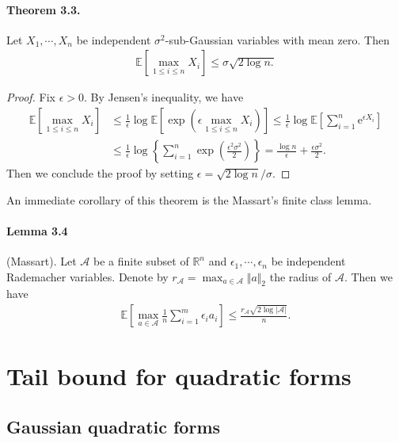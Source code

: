 \documentclass{article}
\newcommand{\E}{\mathbb{E}}
\begin{document}
\paragraph{Theorem 3.3.} Let $X_1,\cdots,X_n$ be independent $\sigma^2$-sub-Gaussian variables with mean zero. Then
\begin{align*}
	\E\left[\max_{1\leq i\leq n}X_i\right] \leq \sigma\sqrt{2\log n.}\tag{3.4}
\end{align*}
\begin{proof}
Fix $\epsilon > 0.$ By Jensen's inequality, we have
\begin{align*}
	\E\left[\max_{1\leq i\leq n}X_i\right] &\leq \frac{1}{\epsilon}\log \E\left[\exp\left(\epsilon\max_{1\leq i\leq n}X_i\right)\right] \leq \frac{1}{\epsilon}\log\E\left[\sum_{i=1}^n \mathrm{e}^{\epsilon X_i}\right]\\
	&\leq \frac{1}{\epsilon}\log\left\{\sum_{i=1}^n \exp\left(\frac{\epsilon^2\sigma^2}{2}\right)\right\}
	= \frac{\log n}{\epsilon}+\frac{\epsilon\sigma^2}{2}.\tag{3.5}
\end{align*}
Then we conclude the proof by setting $\epsilon = \sqrt{2\log n}/\sigma$.
\end{proof}

An immediate corollary of this theorem is the Massart's finite class lemma.
\paragraph{Lemma 3.4} (Massart). Let $\mathcal{A}$ be a finite subset of $\mathbb{R}^n$ and $\epsilon_1,\cdots,\epsilon_n$ be independent Rademacher variables. Denote by $r_\mathcal{A}=\max_{a\in\mathcal{A}}\Vert a\Vert_2$ the radius of $\mathcal{A}.$ Then we have
\begin{align*}
	\E\left[\max_{a\in\mathcal{A}}\frac{1}{n}\sum_{i=1}^m\epsilon_ia_i\right]\leq\frac{r_\mathcal{A}\sqrt{2\log\vert\mathcal{A}\vert}}{n}.\tag{3.6}
\end{align*}

\section{Tail bound for quadratic forms}
\subsection{Gaussian quadratic forms}
\end{document}
